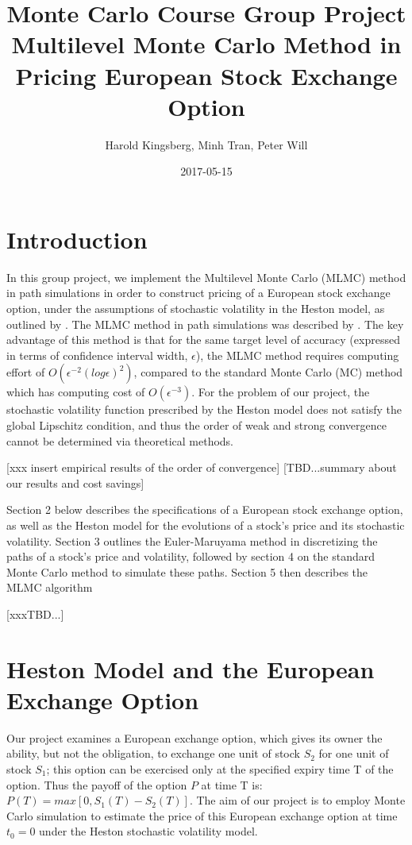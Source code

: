 \documentclass{article}
\title{Monte Carlo Course Group Project \\ 
Multilevel Monte Carlo Method in Pricing European Stock Exchange Option}
\author{Harold Kingsberg, Minh Tran, Peter Will}
\date{2017-05-15}
\begin{document}
\maketitle
\tableofcontents

\newpage
\section{Introduction} 
	In this group project, we implement the Multilevel Monte Carlo (MLMC) method in path simulations in order to construct pricing of a European stock exchange option, under the assumptions of stochastic volatility in the Heston model, as outlined by \cite{heston93}. The MLMC method in path simulations was described by \cite{giles08}. The key advantage of this method is that for the same target level of accuracy (expressed in terms of confidence interval width, $\epsilon$), the MLMC method requires computing effort of $O(\epsilon^{-2}(log\epsilon)^2)$, compared to the standard Monte Carlo (MC) method which has computing cost of $O(\epsilon^{-3})$. For the problem of our project, the stochastic volatility function prescribed by the Heston model does not satisfy the global Lipschitz condition, and thus the order of weak and strong convergence cannot be determined \cite{giles08} via theoretical methods.
	
	[xxx insert empirical results of the order of convergence]
	[TBD...summary about our results and cost savings]
	
	Section 2 below describes the specifications of a European stock exchange option, as well as the Heston model for the evolutions of a stock's price and its stochastic volatility. Section 3 outlines the Euler-Maruyama method in discretizing the paths of a stock's price and volatility, followed by section 4 on the standard Monte Carlo method to simulate these paths. Section 5 then describes the MLMC algorithm 
	
	[xxxTBD...]

\section{Heston Model and the European Exchange Option}
	Our project examines a European exchange option, which gives its owner the ability, but not the obligation, to exchange one unit of stock $S_2$ for one unit of stock $S_1$; this option can be exercised only at the specified expiry time T of the option. Thus the payoff of the option $P$ at time T is: $P(T)=max[0, S_1(T)-S_2(T)]$. The aim of our project is to employ Monte Carlo simulation to estimate the price of this European exchange option at time $t_0=0$ under the Heston stochastic volatility model.
    
\end{document}
